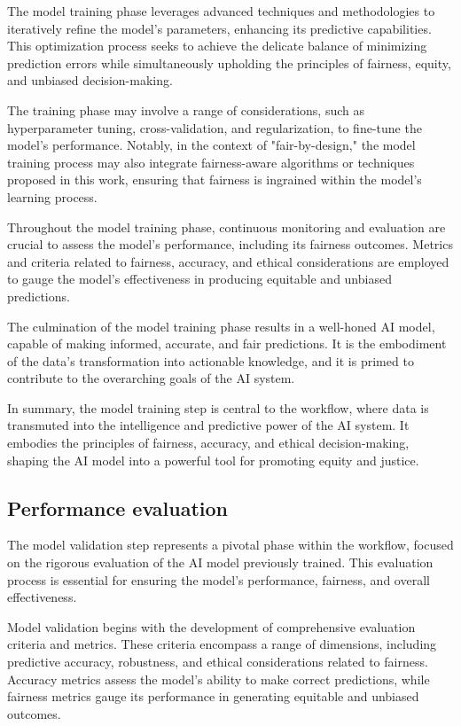 \documentclass[12pt,a4paper,openright,twoside]{book}
\begin{document}
The model training phase leverages advanced techniques and methodologies to iteratively refine the model's parameters, enhancing its predictive capabilities. This optimization process seeks to achieve the delicate balance of minimizing prediction errors while simultaneously upholding the principles of fairness, equity, and unbiased decision-making. 

The training phase may involve a range of considerations, such as hyperparameter tuning, cross-validation, and regularization, to fine-tune the model's performance. Notably, in the context of "fair-by-design," the model training process may also integrate fairness-aware algorithms or techniques proposed in this work, ensuring that fairness is ingrained within the model's learning process. 

Throughout the model training phase, continuous monitoring and evaluation are crucial to assess the model's performance, including its fairness outcomes. Metrics and criteria related to fairness, accuracy, and ethical considerations are employed to gauge the model's effectiveness in producing equitable and unbiased predictions. 

The culmination of the model training phase results in a well-honed AI model, capable of making informed, accurate, and fair predictions. It is the embodiment of the data's transformation into actionable knowledge, and it is primed to contribute to the overarching goals of the AI system. 

In summary, the model training step is central to the workflow, where data is transmuted into the intelligence and predictive power of the AI system. It embodies the principles of fairness, accuracy, and ethical decision-making, shaping the AI model into a powerful tool for promoting equity and justice.

\subsection{Performance evaluation}
The model validation step represents a pivotal phase within the workflow, focused on the rigorous evaluation of the AI model previously trained. This evaluation process is essential for ensuring the model's performance, fairness, and overall effectiveness. 

Model validation begins with the development of comprehensive evaluation criteria and metrics. These criteria encompass a range of dimensions, including predictive accuracy, robustness, and ethical considerations related to fairness. Accuracy metrics assess the model's ability to make correct predictions, while fairness metrics gauge its performance in generating equitable and unbiased outcomes. 
\end{document}
